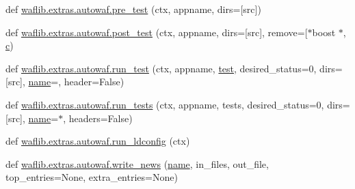 \begin{DoxyCompactItemize}
def \hyperlink{namespacewaflib_1_1extras_1_1autowaf_a1e9202262e2d472df9ee49ce81722357}{waflib.\+extras.\+autowaf.\+pre\+\_\+test} (ctx, appname, dirs=\mbox{[}\textquotesingle{}src\textquotesingle{}\mbox{]})
\item 
def \hyperlink{namespacewaflib_1_1extras_1_1autowaf_a592777169c3be423995cb6fef5d9d916}{waflib.\+extras.\+autowaf.\+post\+\_\+test} (ctx, appname, dirs=\mbox{[}\textquotesingle{}src\textquotesingle{}\mbox{]}, remove=\mbox{[}\textquotesingle{}$\ast$boost $\ast$\textquotesingle{}, \hyperlink{rfft2d_test_m_l_8m_ae0323a9039add2978bf5b49550572c7c}{c})
\item 
def \hyperlink{namespacewaflib_1_1extras_1_1autowaf_af4e8ad0d58d1e2cebbda50fe5db24716}{waflib.\+extras.\+autowaf.\+run\+\_\+test} (ctx, appname, \hyperlink{patest__multi__sine_8c_a4e1a7dd05b97e23b3dd1aed354405b63}{test}, desired\+\_\+status=0, dirs=\mbox{[}\textquotesingle{}src\textquotesingle{}\mbox{]}, \hyperlink{lib_2expat_8h_a1b49b495b59f9e73205b69ad1a2965b0}{name}=\textquotesingle{}\textquotesingle{}, header=False)
\item 
def \hyperlink{namespacewaflib_1_1extras_1_1autowaf_a2f3e56b56bad990a13d15abb3c999936}{waflib.\+extras.\+autowaf.\+run\+\_\+tests} (ctx, appname, tests, desired\+\_\+status=0, dirs=\mbox{[}\textquotesingle{}src\textquotesingle{}\mbox{]}, \hyperlink{lib_2expat_8h_a1b49b495b59f9e73205b69ad1a2965b0}{name}=\textquotesingle{}$\ast$\textquotesingle{}, headers=False)
\item 
def \hyperlink{namespacewaflib_1_1extras_1_1autowaf_a42e4bf29e88cac78d9fa31a3390bff02}{waflib.\+extras.\+autowaf.\+run\+\_\+ldconfig} (ctx)
\item 
def \hyperlink{namespacewaflib_1_1extras_1_1autowaf_a1dc345b6e52594a9670401b3340ce85a}{waflib.\+extras.\+autowaf.\+write\+\_\+news} (\hyperlink{lib_2expat_8h_a1b49b495b59f9e73205b69ad1a2965b0}{name}, in\+\_\+files, out\+\_\+file, top\+\_\+entries=None, extra\+\_\+entries=None)
\end{DoxyCompactItemize}
